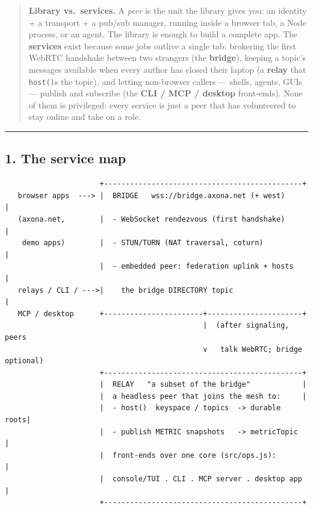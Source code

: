 \documentclass[
  nobib]{tufte-handout}
\begin{document}
\begin{quote}
\textbf{Library vs.~services.} A \emph{peer} is the unit the library
gives you: an identity + a transport + a pub/sub manager, running inside
a browser tab, a Node process, or an agent. The library is enough to
build a complete app. The \textbf{services} exist because some jobs
outlive a single tab: brokering the first WebRTC handshake between two
strangers (the \textbf{bridge}), keeping a topic's messages available
when every author has closed their laptop (a \textbf{relay} that
\texttt{host()}s the topic), and letting non-browser callers --- shells,
agents, GUIs --- publish and subscribe (the \textbf{CLI / MCP / desktop}
front-ends). None of them is privileged: every service is just a peer
that has volunteered to stay online and take on a role.
\end{quote}

\begin{center}\rule{0.5\linewidth}{0.5pt}\end{center}

\subsection{1. The service map}\label{the-service-map}

\begin{verbatim}
                      +----------------------------------------------+
   browser apps  ---> |  BRIDGE   wss://bridge.axona.net (+ west)     |
   (axona.net,        |  - WebSocket rendezvous (first handshake)     |
    demo apps)        |  - STUN/TURN (NAT traversal, coturn)          |
                      |  - embedded peer: federation uplink + hosts   |
   relays / CLI / --->|    the bridge DIRECTORY topic                 |
   MCP / desktop      +-----------------------+----------------------+
                                              |  (after signaling, peers
                                              v   talk WebRTC; bridge optional)
                      +----------------------------------------------+
                      |  RELAY   "a subset of the bridge"            |
                      |  a headless peer that joins the mesh to:     |
                      |  - host()  keyspace / topics  -> durable roots|
                      |  - publish METRIC snapshots   -> metricTopic  |
                      |  front-ends over one core (src/ops.js):       |
                      |  console/TUI . CLI . MCP server . desktop app |
                      +----------------------------------------------+
\end{verbatim}
\end{document}
